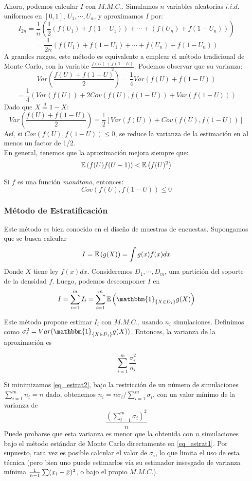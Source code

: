 Ahora, podemos calcular $I$ con $M.M.C.$. Simulamos $n$ variables aleatorias $i.i.d.$ uniformes en $[0,1]$, $U_1,\cdots,U_n$, y aproximamos $I$ por:
\[I_{2n} = \frac{1}{n}\left(\frac{1}{2}(f(U_1)+f(1-U_1))+ \cdots + (f(U_n)+f(1-U_n))\right)\]
\[= \frac{1}{2n}(f(U_1)+f(1-U_1) + \cdots + f(U_n) + f(1-U_n))\]
A grandes razgos, este método es equivalente a emplear el método tradicional de Monte Carlo, con la variable $\frac{f(U)+f(1-U)}{2}$. Podemos observar que su varianza:
\[Var\left(\frac{f(U)+f(1-U)}{2}\right) = \frac{1}{4}Var\left(f(U) + f(1-U)\right)\]
\[= \frac{1}{4}\left(Var\left(f(U)\right) + 2Cov\left(f(U),f(1-U)\right) + Var\left(f(1-U)\right)\right)\]
Dado que $X\overset{d}{=}1-X$:
\[Var\left(\frac{f(U)+f(1-U)}{2}\right) = \frac{1}{2}\left[Var(f(U)) + Cov(f(U),f(1-U))\right]\]
Así, si $Cov(f(U),f(1-U)) \leq 0$, se reduce la varianza de la estimación en al menos un factor de 1/2.\\ \newline
En general, tenemos que la aproximación mejora siempre que:
\[\mathbb E\left(f(U)f(U-1)\right) < \mathbb E\left(f(U)^2\right)\]

\begin{lem} Si $f$ es una función \textit{monótona}, entonces:
\[Cov(f(U),f(1-U)) \leq0\]
\end{lem}
\subsubsection{Método de Estratificación}
Este método es bien conocido en el diseño de muestras de encuestas. Supongamos que se busca calcular
\[I = \mathbb E\left(g(X)\right) = \int g(x)f(x)dx\]
Donde $X$ tiene ley $f(x)dx$. Consideremos $D_1,\cdots,D_m$, una partición del soporte de la densidad $f$. Luego, podemos descomponer $I$ en
\begin{equation}
    I = \sum_{i=1}^m I_i = \sum_{i=1}^m \E\left(\mathbbm{1}_{\{X\in D_i\}}g(X)\right)
    \label{eq_estrat1}
\end{equation}

Este método propone estimar $I_i$ con $M.M.C.$, usando $n_i$ simulaciones. Definimos como $\sigma_i^2 = Var(\mathbbm{1}_{\{X\in D_i\}}g(X))$. Entonces, la varianza de la aproximación es

\begin{equation}
    \sum_{i=1}^m \frac{\sigma_i^2}{n_i}
    \label{eq_estrat2}
\end{equation}

Si minimizamos \ref{eq_estrat2}, bajo la restricción de un número de simulaciones $\sum_{i=1}^m n_i = n$ dado, obtenemos $n_i =n\sigma_i/\sum_{i=1}^m\sigma_i$, con un valor mínimo de la varianza de
\[\frac{\left(\sum_{i=1}^m \sigma_i\right)^2}{n}\]
Puede probarse que esta varianza es menor que la obtenida con $n$ simulaciones bajo el método estándar de Monte Carlo directamente en \ref{eq_estrat1}. Por supuesto, rara vez es posible calcular el valor de $\sigma_i$, lo que limita el uso de esta técnica (pero bien uno puede estimarlos vía su estimador insesgado de varianza mínima $\frac{1}{n-1}\sum (x_i-\Bar{x})^2$, o bajo el propio $M.M.C.$).
